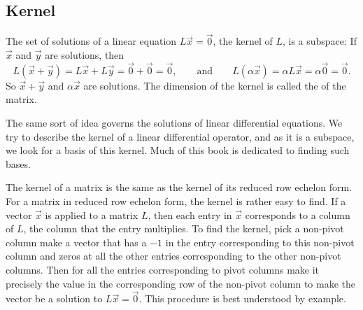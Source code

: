 \subsection{Kernel}

The set of solutions of a linear equation $L\vec{x} = \vec{0}$, 
the kernel of $L$, is a subspace:
If $\vec{x}$ and $\vec{y}$ are solutions,
then
\begin{equation*}
L(\vec{x}+\vec{y}) = 
L\vec{x}+L\vec{y} = 
\vec{0}+\vec{0} = \vec{0} ,
\qquad \text{and} \qquad
L(\alpha \vec{x}) = 
\alpha L \vec{x} = 
\alpha \vec{0} = \vec{0}.
\end{equation*}
So $\vec{x}+\vec{y}$ and $\alpha \vec{x}$ are solutions.
The dimension of the kernel is called the \emph{} of the
matrix.

The same sort of idea governs the solutions of linear differential
equations.  We try to describe the kernel of a linear differential 
operator, and as it is a subspace, we look for a basis of this
kernel.  Much of this book is dedicated to finding such bases.

The kernel of a matrix is the same as the kernel of its reduced row echelon
form.  For a matrix in reduced row echelon form, the kernel is rather easy to
find.  If a vector $\vec{x}$ is applied to a matrix $L$, then each entry in
$\vec{x}$ corresponds to a column of $L$, the column that the entry
multiplies.
To find the kernel,
pick a 
non-pivot column make a vector that has a $-1$ in the entry
corresponding to this non-pivot column and zeros at all the other entries
corresponding to the other non-pivot columns.
Then for all the entries
corresponding to pivot columns make it precisely the value in the
corresponding row of the non-pivot column to make the vector be a
solution to $L \vec{x} = \vec{0}$.
This procedure is best understood by example.

